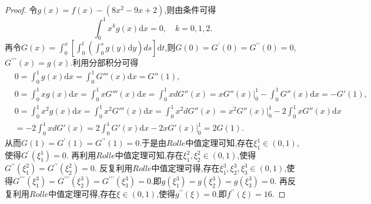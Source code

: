 \documentclass[../../main.tex]{subfiles}
\begin{document}
\begin{proof}
令\(g(x)=f(x)-(8x^2 - 9x + 2)\),则由条件可得
\[
\int_0^1 x^k g(x)\mathrm{d}x = 0, \quad k = 0,1,2.
\]
再令\(G(x)=\int_0^x\left[\int_0^t\left(\int_0^s g(y)\mathrm{d}y\right)ds\right]\mathrm{d}t\),则\(G(0)=G^\prime(0)=G^{\prime\prime}(0)=0\),\(G^{\prime\prime\prime}(x)=g(x)\).利用分部积分可得
\begin{align*}
&0=\int_0^1{g\left( x \right) \mathrm{d}x}=\int_0^1{G'''\left( x \right) \mathrm{d}x}=G''\left( 1 \right) ,
\\
&0=\int_0^1{xg\left( x \right) \mathrm{d}x}=\int_0^1{xG'''\left( x \right) \mathrm{d}x}=\int_0^1{xdG''\left( x \right)}=xG''\left( x \right) \Big |_{0}^{1}-\int_0^1{G''\left( x \right) \mathrm{d}x}=-G'\left( 1 \right) ,
\\
&0=\int_0^1{x^2g\left( x \right) \mathrm{d}x}=\int_0^1{x^2G'''\left( x \right) \mathrm{d}x}=\int_0^1{x^2dG''\left( x \right)}=x^2G''\left( x \right) \Big |_{0}^{1}-2\int_0^1{xG''\left( x \right) \mathrm{d}x}
\\
&=-2\int_0^1{xdG'\left( x \right)}=2\int_0^1{G'\left( x \right) \mathrm{d}x}-2xG'\left( x \right) \Big |_{0}^{1}=2G\left( 1 \right) .
\end{align*}
从而\(G(1)=G^\prime(1)=G^{\prime\prime}(1)=0\).于是由\(Rolle\)中值定理可知,存在\(\xi_1^1\in(0,1)\),使得\(G^\prime(\xi_1^1)=0\).
再利用\(Rolle\)中值定理可知,存在\(\xi_1^2,\xi_2^2\in(0,1)\),使得\(G^{\prime\prime}(\xi_1^2)=G^{\prime\prime}(\xi_2^2)=0\).
反复利用\(Rolle\)中值定理可得,存在\(\xi_1^3,\xi_2^3,\xi_3^3\in(0,1)\),使得\(G^{\prime\prime\prime}(\xi_1^3)=G^{\prime\prime\prime}(\xi_2^3)=G^{\prime\prime\prime}(\xi_3^3)=0\).即\(g(\xi_1^3)=g(\xi_2^3)=g(\xi_3^3)=0\).
再反复利用\(Rolle\)中值定理可得,存在\(\xi\in(0,1)\),使得\(g^{\prime\prime}(\xi)=0\).即\(f^{\prime\prime}(\xi)=16\).

\end{proof}
\end{document}
